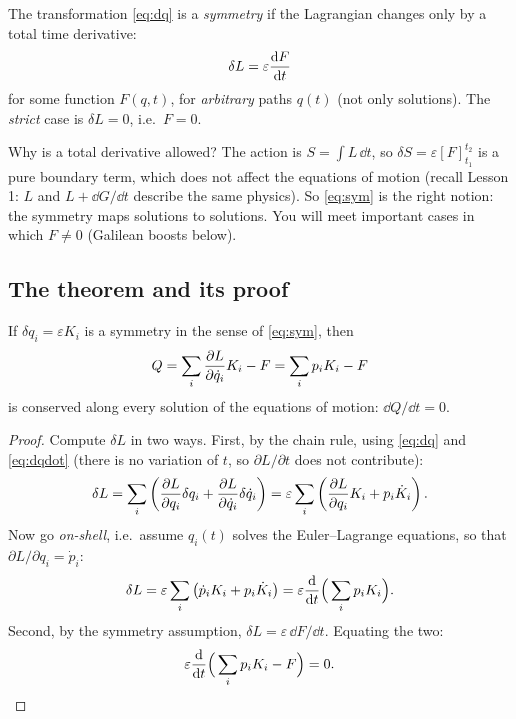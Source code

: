 \documentclass[11pt]{article}
\newcommand{\eps}{\varepsilon}
\begin{document}
\begin{definition}[Symmetry]
The transformation \eqref{eq:dq} is a \emph{symmetry} if the Lagrangian changes only by a total time derivative:
\begin{equation}
  \delta L=\eps\diff{F}{t}
  \label{eq:sym}
\end{equation}
for some function $F(q,t)$, for \emph{arbitrary} paths $q(t)$ (not only solutions). The \emph{strict} case is $\delta L=0$, i.e.\ $F=0$.
\end{definition}

Why is a total derivative allowed? The action is $S=\int L\,\dd t$, so $\delta S=\eps[F]_{t_1}^{t_2}$ is a pure boundary term, which does not affect the equations of motion (recall Lesson 1: $L$ and $L+\dd G/\dd t$ describe the same physics). So \eqref{eq:sym} is the right notion: the symmetry maps solutions to solutions. You will meet important cases in which $F\neq0$ (Galilean boosts below).

\subsection{The theorem and its proof}

\begin{theorem}\label{thm:noether-particle}
If $\delta q_i=\eps K_i$ is a symmetry in the sense of \eqref{eq:sym}, then
\begin{equation}
  Q=\sum_i\frac{\partial L}{\partial \dot q_i}K_i-F=\sum_i p_iK_i-F
\end{equation}
is conserved along every solution of the equations of motion: $\dd Q/\dd t=0$.
\end{theorem}

\begin{proof}
Compute $\delta L$ in two ways. First, by the chain rule, using \eqref{eq:dq} and \eqref{eq:dqdot} (there is no variation of $t$, so $\partial L/\partial t$ does not contribute):
\begin{equation}
  \delta L=\sum_i\left(\pdiff{L}{q_i}\delta q_i+\pdiff{L}{\dot q_i}\delta\dot q_i\right)
  =\eps\sum_i\left(\pdiff{L}{q_i}K_i+p_i\dot K_i\right).
\end{equation}
Now go \emph{on-shell}, i.e.\ assume $q_i(t)$ solves the Euler--Lagrange equations, so that $\partial L/\partial q_i=\dot p_i$:
\begin{equation}
  \delta L=\eps\sum_i\left(\dot p_iK_i+p_i\dot K_i\right)=\eps\diff{}{t}\Big(\sum_ip_iK_i\Big).
\end{equation}
Second, by the symmetry assumption, $\delta L=\eps\,\dd F/\dd t$. Equating the two:
\begin{equation}
  \eps\diff{}{t}\Big(\sum_ip_iK_i-F\Big)=0 .\qedhere
\end{equation}
\end{proof}
\end{document}
